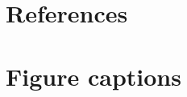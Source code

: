 \documentclass[utf8]{frontiersSCNS} %
\begin{document}
\section*{References}




\section*{Figure captions}


%
%

\end{document}

